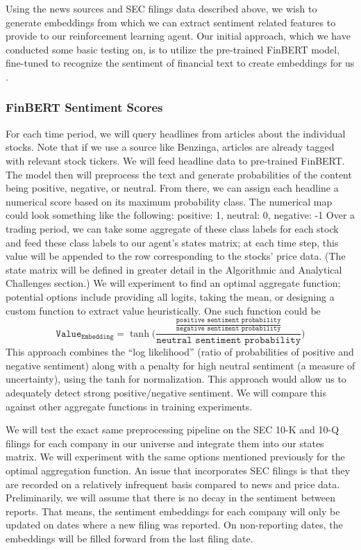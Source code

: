 Using the news sources and SEC filings data described above, we wish to 
generate embeddings from which we can extract sentiment related features 
to provide to our reinforcement learning agent. Our initial approach, which 
we have conducted some basic testing on, is to utilize the pre-trained 
FinBERT model, fine-tuned to recognize the sentiment of financial text to 
create embeddings for us \cite{finbert}. 

\subsubsection{FinBERT Sentiment Scores}

For each time period, we will query headlines from articles about the individual 
stocks. Note that if we use a source like Benzinga, articles are already tagged 
with relevant stock tickers. We will feed headline data to pre-trained FinBERT. 
The model then will preprocess the text and generate probabilities of the content 
being positive, negative, or neutral. From there, we can assign each headline a 
numerical score based on its maximum probability class. The numerical map could 
look something like the following:  {positive: 1, neutral: 0, negative: -1} 
Over a trading period, we can take some aggregate of these class labels for 
each stock and feed these class labels to our agent’s states matrix; at each 
time step, this value will be appended to the row corresponding to the stocks’ 
price data. (The state matrix will be defined in greater detail in the Algorithmic 
and Analytical Challenges section.) We will experiment to find an optimal 
aggregate function; potential options include providing all logits, 
taking the mean, or designing a custom function to extract value heuristically. 
One such function could be
\[\texttt{Value}_{\texttt{Embedding}} = \tanh\Biggl( \frac{\frac{\texttt{positive sentiment probability}}{\texttt{negative sentiment probability}}}{\texttt{neutral sentiment probability}} \Biggr)\]
This approach combines the “log likelihood” (ratio of probabilities of positive and 
negative sentiment) along with a penalty for high neutral sentiment (a measure of 
uncertainty), using the tanh for normalization. This approach would allow us to 
adequately detect strong positive/negative sentiment. We will compare this against 
other aggregate functions in training experiments.

We will test the exact same preprocessing pipeline on the SEC 10-K and 10-Q filings 
for each company in our universe and integrate them into our states matrix. We will 
experiment with the same options mentioned previously for the optimal aggregation 
function. An issue that incorporates SEC filings is that they are recorded on a 
relatively infrequent basis compared to news and price data. Preliminarily, we will 
assume that there is no decay in the sentiment between reports. That means, 
the sentiment embeddings for each company will only be updated on dates where a
new filing was reported. On non-reporting dates, the embeddings will be filled 
forward from the last filing date. 

